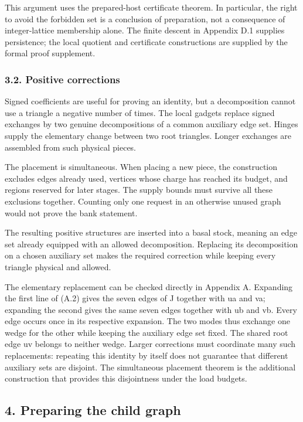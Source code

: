 \documentclass[english,11pt,a4paper]{article}
\begin{document}
This argument uses the prepared-host certificate theorem. In particular, the right to avoid the forbidden set is a conclusion of preparation, not a consequence of integer-lattice membership alone. The finite descent in Appendix D.1 supplies persistence; the local quotient and certificate constructions are supplied by the formal proof supplement.

\subsubsection{3.2. Positive corrections}\label{positive-corrections}

Signed coefficients are useful for proving an identity, but a decomposition cannot use a triangle a negative number of times. The local gadgets replace signed exchanges by two genuine decompositions of a common auxiliary edge set. Hinges supply the elementary change between two root triangles. Longer exchanges are assembled from such physical pieces.

The placement is simultaneous. When placing a new piece, the construction excludes edges already used, vertices whose charge has reached its budget, and regions reserved for later stages. The supply bounds must survive all these exclusions together. Counting only one request in an otherwise unused graph would not prove the bank statement.

The resulting positive structures are inserted into a basal stock, meaning an edge set already equipped with an allowed decomposition. Replacing its decomposition on a chosen auxiliary set makes the required correction while keeping every triangle physical and allowed.

The elementary replacement can be checked directly in Appendix A. Expanding the first line of (A.2) gives the seven edges of J together with ua and va; expanding the second gives the same seven edges together with ub and vb. Every edge occurs once in its respective expansion. The two modes thus exchange one wedge for the other while keeping the auxiliary edge set fixed. The shared root edge uv belongs to neither wedge. Larger corrections must coordinate many such replacements: repeating this identity by itself does not guarantee that different auxiliary sets are disjoint. The simultaneous placement theorem is the additional construction that provides this disjointness under the load budgets.

\subsection{4. Preparing the child graph}\label{preparing-the-child-graph}
\end{document}
